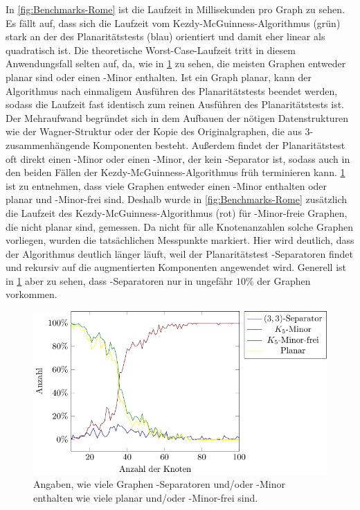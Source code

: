In \Abb \ref{fig:Benchmarks-Rome} ist die Laufzeit in Millisekunden pro Graph zu sehen.
Es fällt auf, dass sich die Laufzeit vom Kezdy-McGuinness-Algorithmus (grün) stark an der des Planaritätstests (blau) orientiert und damit eher linear als quadratisch ist.
Die theoretische Worst-Case-Laufzeit tritt in diesem Anwendungsfall selten auf, da, wie in \Abb \ref{fig:Statistics-Rome} zu sehen, die meisten Graphen entweder planar sind oder einen \kf-Minor enthalten.
Ist ein Graph planar, kann der Algorithmus nach einmaligem Ausführen des Planaritätstests beendet werden, sodass die Laufzeit fast identisch zum reinen Ausführen des Planaritätstests ist.
Der Mehraufwand begründet sich in dem Aufbauen der nötigen Datenstrukturen wie der Wagner-Struktur oder der Kopie des Originalgraphen, die aus $3$-zusammenhängende Komponenten besteht.
Außerdem findet der Planaritätstest oft direkt einen \kf-Minor oder einen \kdd-Minor, der kein \dd-Separator ist, sodass auch in den beiden Fällen der Kezdy-McGuinness-Algorithmus früh terminieren kann.
\Abb \ref{fig:Statistics-Rome} ist zu entnehmen, dass viele Graphen entweder einen \kf-Minor enthalten oder planar und \kf-Minor-frei sind.
Deshalb wurde in \Abb \ref{fig:Benchmarks-Rome} zusätzlich die Laufzeit des Kezdy-McGuinness-Algorithmus (rot) für \kf-Minor-freie Graphen, die nicht planar sind, gemessen.
Da nicht für alle Knotenanzahlen solche Graphen vorliegen, wurden die tatsächlichen Messpunkte markiert.
Hier wird deutlich, dass der Algorithmus deutlich länger läuft, weil der Planaritätstest \dd-Separatoren findet und rekursiv auf die augmentierten Komponenten angewendet wird.
Generell ist in \Abb \ref{fig:Statistics-Rome} aber zu sehen, dass \dd-Separatoren nur in ungefähr $10\%$ der Graphen vorkommen.

\begin{figure}[H]
  \centering
  \includegraphics[width=\textwidth,height=\textheight,keepaspectratio]{plots/Statistics_Rome.pdf}
  \caption{Angaben, wie viele Graphen \dd-Separatoren und/oder \kf-Minor enthalten \bzw wie viele planar und/oder \kf-Minor-frei sind.}
  \label{fig:Statistics-Rome}
\end{figure}

